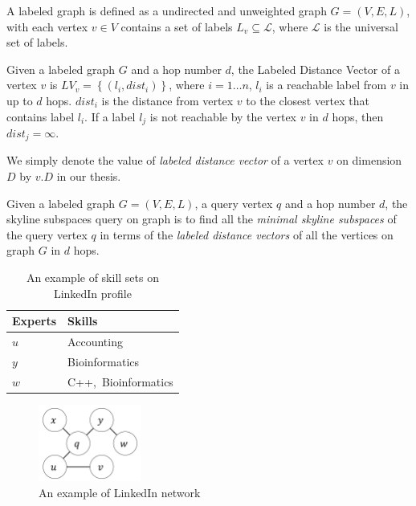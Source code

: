\begin{definition}
A labeled graph is defined as a undirected and unweighted graph $G = (V, E, L)$, with each vertex $v \in V$ contains a set of labels $L_v \subseteq \mathcal{L}$, where $\mathcal{L}$ is the universal set of labels.
\end{definition}

\begin{definition}
Given a labeled graph $G$ and a hop number $d$, the Labeled Distance Vector of a vertex $v$ is $LV_v=\left\{\left(l_i, dist_i\right)\right\}$, where $i = 1 \ldots n$, $l_i$ is a reachable label from $v$ in up to $d$ hops. $dist_i$ is the distance from vertex $v$ to the closest vertex that contains label $l_i$. If a label $l_j$ is not reachable by the vertex $v$ in $d$ hops, then $dist_j = \infty$. 
\end{definition}

We simply denote the value of \emph{labeled distance vector} of a vertex $v$ on dimension $D$ by $v.D$ in our thesis.

\begin{definition}
Given a labeled graph $G = (V, E, L)$, a query vertex $q$ and a hop number $d$, the skyline subspaces query on graph is to find all the \emph{minimal skyline subspaces} of the query vertex $q$ in terms of the \emph{labeled distance vectors} of all the vertices on graph $G$ in $d$ hops.
\end{definition}

\begin{table}[h]
    \centering
    \begin{tabular}{|l|l|}
    \hline
    Experts     & Skills \\ \hline
    $u$         & Accounting     \\ \hline
    $y$         & Bioinformatics  \\ \hline
    $w$         & C++,~Bioinformatics \\ \hline
    \end{tabular}
    \caption{\label{tab:skill_sets}An example of skill sets on LinkedIn profile}
\end{table}
    
\begin{figure}[h]
    \centering
    \includegraphics[width=0.3\textwidth]{figs/graph_example}
    \caption{An example of LinkedIn network}
    \label{fig:graph}
\end{figure}

